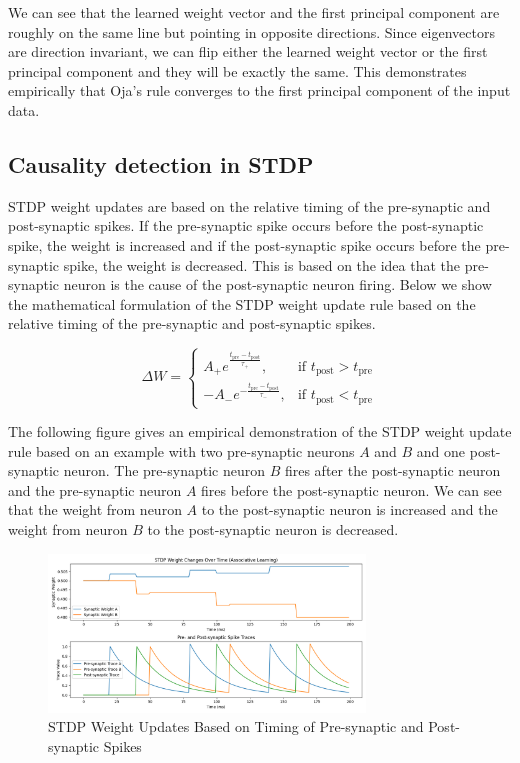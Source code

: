 \documentclass[12pt, letterpaper]{article}
\begin{document}
We can see that the learned weight vector and the first principal component are roughly on the same line but pointing in opposite directions. Since eigenvectors are direction invariant, we can flip either the learned weight vector or the first principal component and they will be exactly the same. This demonstrates empirically that Oja's rule converges to the first principal component of the input data.


\subsection{Causality detection in STDP}

STDP weight updates are based on the relative timing of the pre-synaptic and post-synaptic spikes. If the pre-synaptic spike occurs before the post-synaptic spike, the weight is increased and if the post-synaptic spike occurs before the pre-synaptic spike, the weight is decreased. This is based on the idea that the pre-synaptic neuron is the cause of the post-synaptic neuron firing. Below we show the mathematical formulation of the STDP weight update rule based on the relative timing of the pre-synaptic and post-synaptic spikes.

\begin{equation}
\Delta W =
\begin{cases}
    A_+ e^{\frac{t_{\text{pre}} - t_{\text{post}}}{\tau_+}}, & \text{if } t_{\text{post}} > t_{\text{pre}} \\
    -A_- e^{-\frac{t_{\text{pre}} - t_{\text{post}}}{\tau_-}}, & \text{if } t_{\text{post}} < t_{\text{pre}}
\end{cases}
\end{equation}

The following figure gives an empirical demonstration of the STDP weight update rule based on an example with two pre-synaptic neurons $A$ and $B$ and one post-synaptic neuron. The pre-synaptic neuron $B$ fires after the post-synaptic neuron and the pre-synaptic neuron $A$ fires before the post-synaptic neuron. We can see that the weight from neuron $A$ to the post-synaptic neuron is increased and the weight from neuron $B$ to the post-synaptic neuron is decreased. 

\begin{figure}[H]
    \centering
    \includegraphics[width=0.75\textwidth]{stdp.png}
    \caption{STDP Weight Updates Based on Timing of Pre-synaptic and Post-synaptic Spikes}
    \label{fig:stdp}
\end{figure}
\end{document}
